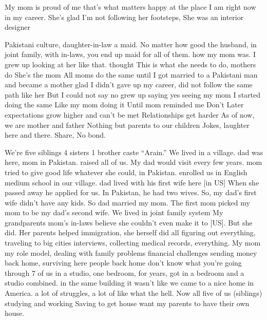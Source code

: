 \begin{FoundPoem}
    My mom is proud of me 
that’s what matters
happy at the place I am right now in my career.
She’s glad I’m
  not following her footsteps,
She was an		interior designer

Pakistani culture,
 daughter-in-law
 		a maid.
No matter how good 
the husband,
in
joint family,
with in-laws,
you end up 
maid for all of them.
how my mom was.
I grew up looking at her like that.
 thought
This is what she needs to do,		 mothers do
She’s the mom
All moms
 do the same 
until I got married to a Pakistani man
 and became a mother
glad
I didn’t gave up my career, 
did not follow the same path like her
But I could not say no
grew up saying yes
seeing my mom 
I started doing the same
Like my mom doing it
Until
mom reminded me 
Don’t 
Later
expectations grow higher
and can’t be met
Relationships get harder
As of now, 	we are mother and father
 Nothing but
parents to our children
Jokes,	 laughter
here and there.
Share,
No	 bond.

We’re five siblings
4 sisters	1 brother 
caste ``Arain.'' 
We lived in a village. 
dad was here, 
mom  in Pakistan. 
raised all of us. 
My dad would visit 		every 		few years. 
mom tried to give 
good life 
whatever she could, 		in Pakistan. 
enrolled us in 				English medium school 
in our village. 
dad lived with his first wife here [in US]
When she passed away  
 he applied 
for us. 
In Pakistan, 	he had two wives. 
So, my dad’s first wife 		didn’t have any kids. 
So
 dad married my mom. 
The first mom picked my mom
 to be my dad’s second wife. 
We lived in joint family system
My grandparents
mom’s in-laws
believe she couldn’t even make it to [US].
But she did.
Her parents helped 
immigration,
she herself did all 
figuring out everything,		
traveling to big cities
interviews,
collecting medical records,
everything.
My mom 
	my role model,
dealing with 
family problems		  financial challenges 
sending money back home, 
surviving here 
people back home don't know 
what you're going through 
			 7 of us in a studio, 
one bedroom, 
	for years, 
got in a bedroom and a studio combined. 
in the same building 
it wasn't like 
 we came to a nice home in America.
a lot of struggles, 
 a lot of like what the hell. 
Now all five of us (siblings) studying and working
Saving to get  house 
want my parents to have their own house.

\end{FoundPoem}

